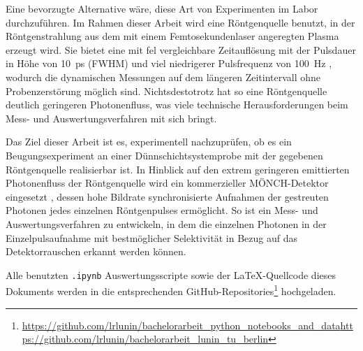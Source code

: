 \noindent
Eine bevorzugte Alternative wäre, diese Art von Experimenten im Labor durchzuführen. Im Rahmen dieser Arbeit wird eine Röntgenquelle benutzt, in der Röntgenstrahlung aus dem mit einem Femtosekundenlaser angeregten Plasma erzeugt wird. Sie bietet eine mit \gls{fel} vergleichbare Zeitauflösung mit der Pulsdauer in Höhe von \SI{10}{\pico\second} (FWHM) und viel niedrigerer Pulsfrequenz von \SI{100}{\hertz} \cite{schick_laser-driven_2021}, wodurch die dynamischen Messungen auf dem längeren Zeitintervall ohne Probenzerstörung möglich sind. Nichtsdestotrotz hat so eine Röntgenquelle deutlich geringeren Photonenfluss, was viele technische Herausforderungen beim Mess- und Auswertungsverfahren mit sich bringt.

\noindent
Das Ziel dieser Arbeit ist es, experimentell nachzuprüfen, ob es ein Beugungsexperiment an einer Dünnschichtsystemprobe mit der gegebenen Röntgenquelle realisierbar ist. In Hinblick auf den extrem geringeren emittierten Photonenfluss der Röntgenquelle wird ein kommerzieller MÖNCH-Detektor eingesetzt \cite{ramilli-measurements-2017}, dessen hohe Bildrate synchronisierte Aufnahmen der gestreuten Photonen jedes einzelnen Röntgenpulses ermöglicht. So ist ein Mess- und Auswertungsverfahren zu entwickeln, in dem die einzelnen Photonen in der Einzelpulsaufnahme mit bestmöglicher Selektivität in Bezug auf das Detektorrauschen erkannt werden können.

\noindent%
Alle benutzten \texttt{.ipynb} Auswertungsscripte sowie der \LaTeX-Quellcode dieses Dokuments werden in die entsprechenden GitHub-Repositories\footnote{\url{https://github.com/lrlunin/bachelorarbeit_python_notebooks_and_data}\newline\url{https://github.com/lrlunin/bachelorarbeit_lunin_tu_berlin}} hochgeladen.   


